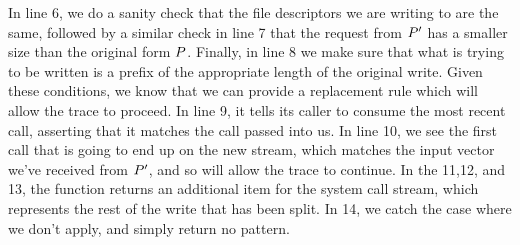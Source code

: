 In line 6, we do a sanity check that the file descriptors we are
writing to are the same, followed by a similar check in line 7 that
the request from $P'$ has a smaller size than the original
form $P$. Finally, in line 8 we make sure that what is trying to be
written is a prefix of the appropriate length of the original write.
Given these conditions, we know that we can provide a replacement rule
which will allow the trace to proceed. In line 9, it tells its caller
to consume the most recent call, asserting that it matches the call
passed into us. In line 10, we see the first call that is going to end up
on the new stream, which matches the input vector we've received from
$P'$, and so will allow the trace to continue. In the 11,12,
and 13, the function returns an additional item for the system call
stream, which represents the rest of the write that has been split.
In 14, we catch the case where we don't apply, and simply return no
pattern.



